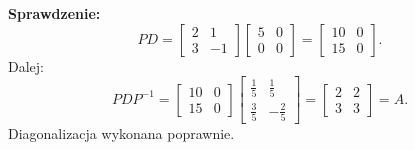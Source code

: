 \documentclass[12pt,a4paper]{article}
\begin{document}
\textbf{Sprawdzenie:}
\[
PD=
\begin{bmatrix}
2&1\\3&-1
\end{bmatrix}
\begin{bmatrix}
5&0\\0&0
\end{bmatrix}
=
\begin{bmatrix}
10&0\\15&0
\end{bmatrix}.
\]
Dalej:
\[
PDP^{-1}=
\begin{bmatrix}
10&0\\15&0
\end{bmatrix}
\begin{bmatrix}
\frac15&\frac15\\
\frac35&-\frac25
\end{bmatrix}
=
\begin{bmatrix}
2&2\\3&3
\end{bmatrix}=A.
\]
Diagonalizacja wykonana poprawnie.
\end{document}
